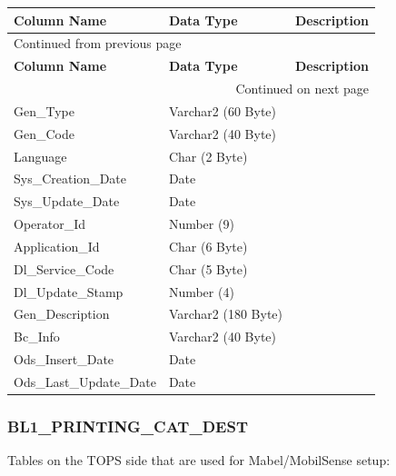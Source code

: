 \documentclass[12pt,twoside]{article}
\begin{document}
\begin{longtable}{l|l|l}
\hline
\textbf{Column Name} & \textbf{Data Type} & \textbf{Description}\\
\hline
\endfirsthead
\multicolumn{3}{l}{Continued from previous page} \\
\hline

\textbf{Column Name} & \textbf{Data Type} & \textbf{Description} \\

\hline
\endhead
\hline\multicolumn{3}{r}{Continued on next page} \\
\endfoot
\endlastfoot
\hline
Gen\_Type & Varchar2 (60 Byte) & \\
Gen\_Code & Varchar2 (40 Byte) & \\
Language & Char (2 Byte) & \\
Sys\_Creation\_Date & Date & \\
Sys\_Update\_Date & Date & \\
Operator\_Id & Number (9) & \\
Application\_Id & Char (6 Byte) & \\
Dl\_Service\_Code & Char (5 Byte) & \\
Dl\_Update\_Stamp & Number (4) & \\
Gen\_Description & Varchar2 (180 Byte) & \\
Bc\_Info & Varchar2 (40 Byte) & \\
Ods\_Insert\_Date & Date & \\
Ods\_Last\_Update\_Date & Date & \\
\hline
\end{longtable}
\normalsize

\subsubsection{BL1\_PRINTING\_CAT\_DEST}
\label{sec:orgheadline149}
Tables on the TOPS side that are used for Mabel/MobilSense setup:
\footnotesize
\end{document}
